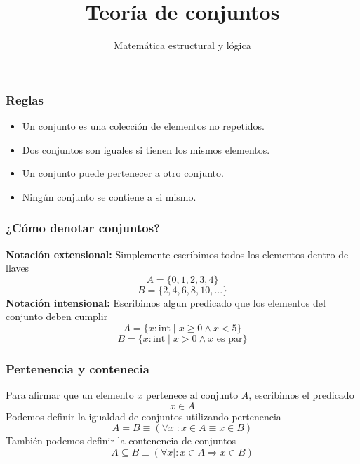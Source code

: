 \documentclass{beamer}
\title{Teoría de conjuntos}
\author{Matemática estructural y lógica}
\institute{ISIS-1104}
\date{}
\newcommand{\then}{\Rightarrow}
\begin{document}
\frame{\titlepage}

\begin{frame}[fragile]
    \frametitle{Reglas}
    \begin{itemize}
        \item Un conjunto es una colección de elementos no repetidos.
        \item Dos conjuntos son iguales si tienen los mismos elementos.
        \item Un conjunto puede pertenecer a otro conjunto.
        \item Ningún conjunto se contiene a si mismo.
    \end{itemize}
\end{frame}

\begin{frame}[fragile]
    \frametitle{¿Cómo denotar conjuntos?}
    \textbf{Notación extensional:} Simplemente escribimos todos los elementos dentro de
    llaves
    $$A = \{0, 1, 2, 3, 4\}$$
    $$B = \{2, 4, 6, 8, 10, ...\}$$
    \textbf{Notación intensional:} Escribimos algun predicado que los elementos del conjunto deben cumplir
    $$A = \{x:\text{int} \mid x \geq 0 \land x < 5 \}$$
    $$B = \{x:\text{int} \mid x > 0 \land x \text{ es par}\}$$    
\end{frame}

\begin{frame}[fragile]
    \frametitle{Pertenencia y contenecia}
    Para afirmar que un elemento $x$ pertenece al conjunto $A$, escribimos el predicado
    $$ x \in A$$
    Podemos definir la igualdad de conjuntos utilizando pertenencia 
    $$A = B \equiv (\forall x \mid : x \in A \equiv x \in B)$$
    También podemos definir la contenencia de conjuntos
    $$A \subseteq B \equiv (\forall x \mid : x \in A \then x \in B)$$
\end{frame}
\end{document}
